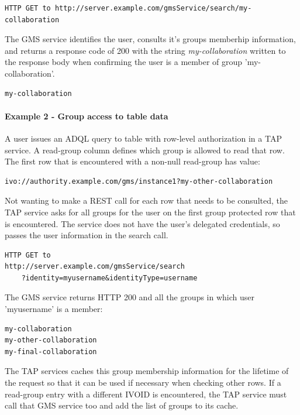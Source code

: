 \documentclass[11pt,a4paper]{ivoa}
\begin{document}
\begin{verbatim}
HTTP GET to http://server.example.com/gmsService/search/my-collaboration
\end{verbatim}

The GMS service identifies the user, consults it's groups memberhip information, and returns a response code of 200 with the string \emph{my-collaboration} written to the response body when confirming the user is a member of group 'my-collaboration'.

\begin{verbatim}
my-collaboration
\end{verbatim}

\paragraph{Example 2 - Group access to table data}

A user issues an ADQL query to table with row-level authorization in a TAP service.  A read-group column defines which group is allowed to read that row.  The first row that is encountered with a non-null read-group has value:

\begin{verbatim}
ivo://authority.example.com/gms/instance1?my-other-collaboration
\end{verbatim}

Not wanting to make a REST call for each row that needs to be consulted, the TAP service asks for all groups for the user on the first group protected row that is encountered.  The service does not have the user's delegated credentials, so passes the user information in the search call.

\begin{verbatim}
HTTP GET to
http://server.example.com/gmsService/search
    ?identity=myusername&identityType=username
\end{verbatim}

The GMS service returns HTTP 200 and all the groups in which user 'myusername' is a member:

\begin{verbatim}
my-collaboration
my-other-collaboration
my-final-collaboration
\end{verbatim}

The TAP services caches this group membership information for the lifetime of the request so that it can be used if necessary when checking other rows.  If a read-group entry with a different IVOID is encountered, the TAP service must call that GMS service too and add the list of groups to its cache.
\end{document}

